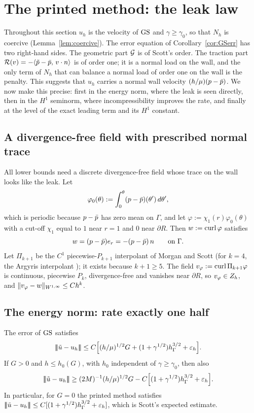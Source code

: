 \section{The printed method: the leak law}\label{sec:printed}

Throughout this section $u_h$ is the velocity of $\mathrm{GS}$ and $\gamma\ge\gamma_0$, so that $N_h$ is coercive (Lemma~\ref{lem:coercive}). The error equation of Corollary~\ref{cor:GSerr} has two right-hand sides. The geometric part $\mathcal G$ is of Scott's order. The traction part $\mathcal R(v)=-\langle \tilde p-\bar p,\, v\cdot n\rangle$ is of order one; it is a normal load on the wall, and the only term of $N_h$ that can balance a normal load of order one on the wall is the penalty. This suggests that $u_h$ carries a normal wall velocity $(h/\mu)(p-\bar p)$. We now make this precise: first in the energy norm, where the leak is seen directly, then in the $H^1$ seminorm, where incompressibility improves the rate, and finally at the level of the exact leading term and its $H^1$ constant.

\subsection{A divergence-free field with prescribed normal trace}
All lower bounds need a discrete divergence-free field whose trace on the wall looks like the leak. Let
\[
\varphi_0(\theta):=\int_0^\theta(p-\bar p)(\theta')\,d\theta',
\]
which is periodic because $p-\bar p$ has zero mean on $\Gamma$, and let $\varphi:=\chi_1(r)\varphi_0(\theta)$ with a cut-off $\chi_1$ equal to $1$ near $r=1$ and $0$ near $\partial R$. Then $w:=\operatorname{curl}\varphi$ satisfies
\[
w=(p-\bar p)e_r=-(p-\bar p)\,n\qquad\text{on }\Gamma .
\]
Let $\Pi_{k+1}$ be the $C^1$ piecewise-$P_{k+1}$ interpolant of Morgan and Scott \cite{MorganScott1975} (for $k=4$, the Argyris interpolant \cite{Argyris1968}); it exists because $k+1\ge5$. The field $v_\varphi:=\operatorname{curl}\Pi_{k+1}\varphi$ is continuous, piecewise $P_k$, divergence-free and vanishes near $\partial R$, so $v_\varphi\in Z_h$, and $\lVert v_\varphi-w\rVert_{W^{1,\infty}}\le Ch^k$.

\subsection{The energy norm: rate exactly one half}

\begin{theorem}\label{thm:A}
The error of $\mathrm{GS}$ satisfies
\[
|\!|\!|\tilde u-u_h|\!|\!|\le C\Bigl[(h/\mu)^{1/2}G+(1+\gamma^{1/2})h_\Gamma^{3/2}+\varepsilon_h\Bigr].
\]
If $G>0$ and $h\le h_0(G)$, with $h_0$ independent of $\gamma\ge\gamma_0$, then also
\[
|\!|\!|\tilde u-u_h|\!|\!|\ge(2M)^{-1}(h/\mu)^{1/2}G-C\Bigl[(1+\gamma^{1/2})h_\Gamma^{3/2}+\varepsilon_h\Bigr].
\]
In particular, for $G=0$ the printed method satisfies $|\!|\!|\tilde u-u_h|\!|\!|\le C[(1+\gamma^{1/2})h_\Gamma^{3/2}+\varepsilon_h]$, which is Scott's expected estimate.
\end{theorem}

